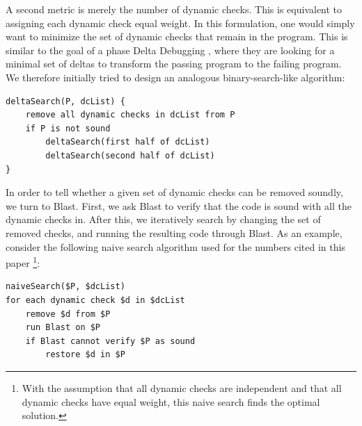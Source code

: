 \documentclass[10pt,letterpaper,twocolumn,english]{article}
\begin{document}
A second metric is merely the number of dynamic checks.  This is
equivalent to assigning each dynamic check equal weight.  In this
formulation, one would simply want to minimize the set of dynamic checks
that remain in the program.  This is similar to the goal of a phase
Delta Debugging \cite{deltaDebugging}, where they are looking for a
minimal set of deltas to transform the passing program to the failing
program.  We therefore initially tried to design an analogous
binary-search-like algorithm:

\begin{verbatim}
deltaSearch(P, dcList) {
	remove all dynamic checks in dcList from P
	if P is not sound
		deltaSearch(first half of dcList)
		deltaSearch(second half of dcList)
}
\end{verbatim}

 


In order to tell whether a given set of dynamic checks can be removed
soundly, we turn to Blast.  First, we ask Blast to verify that the code
is sound with all the dynamic checks in.  After this, we iteratively
search by changing the set of removed checks, and running the resulting
code through Blast.  As an example, consider the following naive search
algorithm used for the numbers cited in this paper \footnote{With the
assumption that all dynamic checks are independent and that all dynamic
checks have equal weight, this naive search finds the optimal
solution.}:

\begin{verbatim}
naiveSearch($P, $dcList)
for each dynamic check $d in $dcList
    remove $d from $P
    run Blast on $P
    if Blast cannot verify $P as sound
        restore $d in $P
\end{verbatim}
\end{document}
